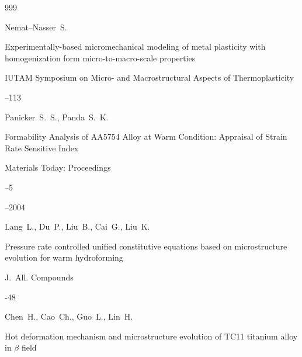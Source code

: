 \begin{thebibliography}{999}











\by Nemat--Nasser~S.


\paper Experimentally-based micromechanical modeling of metal plasticity with homogenization form micro-to-macro-scale properties

\inbook IUTAM Symposium on Micro- and Macrostructural Aspects of Thermoplasticity

–113








\by Panicker~S.~S., Panda~S.~K. 

\paper Formability Analysis of AA5754 Alloy at Warm Condition: Appraisal of Strain Rate Sensitive Index

\jour Materials Today: Proceedings



--5

--2004






\by Lang~L., Du~P., Liu~B., Cai~G., Liu~K.

\paper Pressure rate controlled unified constitutive equations based on microstructure evolution for warm hydroforming

\jour J.~All. Compounds



-48






\by Chen~H., Cao~Ch., Guo~L., Lin~H.

\paper Hot deformation mechanism and microstructure evolution of TC11 titanium alloy in $\beta$ field


\end{thebibliography}
